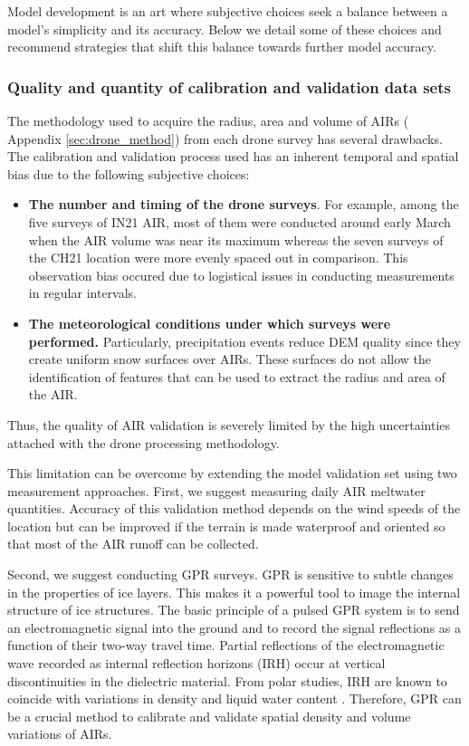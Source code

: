 Model development is an art where subjective choices seek a balance between a model's simplicity and its
accuracy. Below we detail some of these choices and recommend strategies that shift this balance towards further
model accuracy.

\subsubsection{Quality and quantity of calibration and validation data sets}

The methodology used to acquire the radius, area and volume of \ac{AIRs} ( Appendix \ref{sec:drone_method}) from
each drone survey has several drawbacks. The calibration and validation process used has an inherent temporal
and spatial bias due to the following subjective choices:

\begin{itemize}
	\item \textbf{The number and timing of the drone surveys}. For example, among the five surveys of IN21 AIR, most of them were
	      conducted around early March when the AIR volume was near its maximum whereas the seven surveys of the CH21
	      location were more evenly spaced out in comparison. This observation bias occured due to logistical issues
	      in conducting measurements in regular intervals.

	\item \textbf{The meteorological conditions under which surveys were performed.} Particularly, precipitation events reduce DEM quality since
	      they create uniform snow surfaces over \ac{AIRs}. These surfaces do not allow the identification of features
	      that can be used to extract the radius and area of the AIR.

\end{itemize}

Thus, the quality of AIR validation is severely limited by the high uncertainties attached with the drone
processing methodology.

This limitation can be overcome by extending the model validation set using two measurement approaches. First,
we suggest measuring daily AIR meltwater quantities. Accuracy of this validation method depends on the wind
speeds of the location but can be improved if the terrain is made waterproof and oriented so that most of the
AIR runoff can be collected. 

Second, we suggest conducting \ac{GPR} surveys. \ac{GPR} is sensitive to subtle changes in the properties of ice
layers. This makes it a powerful tool to image the internal structure of ice structures. The basic principle of
a pulsed \ac{GPR} system is to send an electromagnetic signal into the ground and to record the signal
reflections as a function of their two-way travel time. Partial reflections of the electromagnetic wave recorded
as internal reflection horizons (IRH) occur at vertical discontinuities in the dielectric material. From polar
studies, IRH are known to coincide with variations in density and liquid water content
\citep{forster2014extensive}. Therefore, \ac{GPR} can be a crucial method to calibrate and validate spatial
density and volume variations of \ac{AIRs}.



